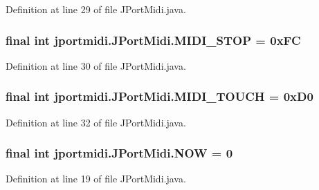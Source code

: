Definition at line 29 of file J\+Port\+Midi.\+java.

\subsubsection[{\texorpdfstring{M\+I\+D\+I\+\_\+\+S\+T\+OP}{MIDI_STOP}}]{\setlength{\rightskip}{0pt plus 5cm}final {\bf int} jportmidi.\+J\+Port\+Midi.\+M\+I\+D\+I\+\_\+\+S\+T\+OP = 0x\+FC}\hypertarget{classjportmidi_1_1_j_port_midi_a2d6a62f21a7f4406a838b23935ddc796}{}\label{classjportmidi_1_1_j_port_midi_a2d6a62f21a7f4406a838b23935ddc796}


Definition at line 30 of file J\+Port\+Midi.\+java.

\subsubsection[{\texorpdfstring{M\+I\+D\+I\+\_\+\+T\+O\+U\+CH}{MIDI_TOUCH}}]{\setlength{\rightskip}{0pt plus 5cm}final {\bf int} jportmidi.\+J\+Port\+Midi.\+M\+I\+D\+I\+\_\+\+T\+O\+U\+CH = 0x\+D0}\hypertarget{classjportmidi_1_1_j_port_midi_abab85600cca100f39f96263fb2733a41}{}\label{classjportmidi_1_1_j_port_midi_abab85600cca100f39f96263fb2733a41}


Definition at line 32 of file J\+Port\+Midi.\+java.

\subsubsection[{\texorpdfstring{N\+OW}{NOW}}]{\setlength{\rightskip}{0pt plus 5cm}final {\bf int} jportmidi.\+J\+Port\+Midi.\+N\+OW = 0}\hypertarget{classjportmidi_1_1_j_port_midi_a8a6bd3a83fb11bf6e51563b161bed0d8}{}\label{classjportmidi_1_1_j_port_midi_a8a6bd3a83fb11bf6e51563b161bed0d8}


Definition at line 19 of file J\+Port\+Midi.\+java.

